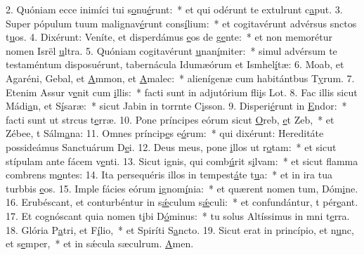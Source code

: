 2. Quóniam ecce inimíci tui s\uline{o}nu\uline{é}runt:~* et qui odérunt te extulrunt c\uline{a}put.
3. Super pópulum tuum malignav\uline{é}runt cons\uline{í}lium:~* et cogitavérunt advérsus snctos t\uline{u}os.
4. Dixérunt: Veníte, et disperdámus \uline{e}os de g\uline{e}nte:~* et non memorétur nomen Isrël \uline{u}ltra.
5. Quóniam cogitavérunt \uline{u}nan\uline{í}miter:~* simul advérsum te testaméntum disposuérunt, tabernácula Idumæórum et Ismhel\uline{í}tæ:
6. Moab, et Agaréni, Gebal, et \uline{A}mmon, et \uline{A}malec:~* alienígenæ cum habitántbus T\uline{y}rum.
7. Etenim Assur v\uline{e}nit cum \uline{i}llis:~* facti sunt in adjutórium fli\uline{i}s Lot.
8. Fac illis sicut Mádi\uline{a}n, et S\uline{í}saræ:~* sicut Jabin in torrnte C\uline{i}sson.
9. Disperi\uline{é}runt in \uline{E}ndor:~* facti sunt ut strcus t\uline{e}rræ.
10. Pone príncipes eórum sicut \uline{O}reb, \uline{e}t Zeb,~* et Zébee, t Sálm\uline{a}na:
11. Omnes príncip\uline{e}s e\uline{ó}rum:~* qui dixérunt: Hereditáte possideámus Sanctuárum D\uline{e}i.
12. Deus meus, pone \uline{i}llos ut r\uline{o}tam:~* et sicut stípulam ante fácem v\uline{e}nti.
13. Sicut ignis, qui comb\uline{ú}rit s\uline{i}lvam:~* et sicut flamma combrens m\uline{o}ntes:
14. Ita persequéris illos in tempest\uline{á}te t\uline{u}a:~* et in ira tua turbbis \uline{e}os.
15. Imple fácies eórum \uline{i}gnom\uline{í}nia:~* et quærent nomen tum, Dóm\uline{i}ne.
16. Erubéscant, et conturbéntur in s\uline{ǽ}culum s\uline{ǽ}culi:~* et confundántur, t pér\uline{e}ant.
17. Et cognóscant quia nomen t\uline{i}bi D\uline{ó}minus:~* tu solus Altíssimus in mni t\uline{e}rra.
18. Glória P\uline{a}tri, et F\uline{í}lio,~* et Spiríti S\uline{a}ncto.
19. Sicut erat in princípio, et n\uline{u}nc, et s\uline{e}mper,~* et in sǽcula sæculrum. \uline{A}men.

